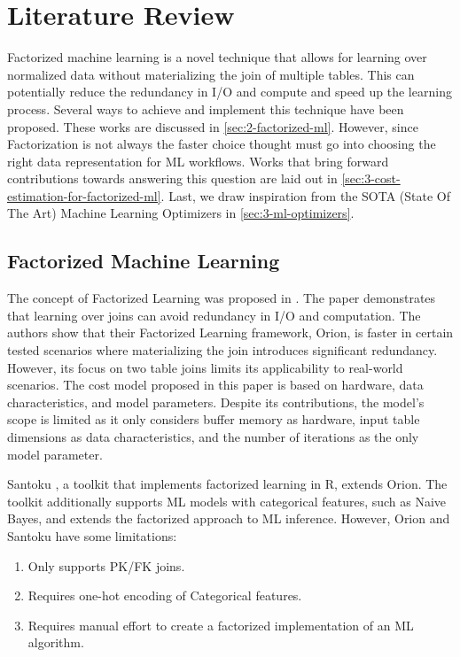 
\chapter{Literature Review}
\label{chapter:literature}

Factorized machine learning is a novel technique that allows for learning over normalized data without materializing the join of multiple tables. This can potentially reduce the redundancy in I/O and compute and speed up the learning process. Several ways to achieve and implement this technique have been proposed. These works are discussed in \autoref{sec:2-factorized-ml}. However, since Factorization is not always the faster choice \cite{orion_learning_gen_lin_models, morpheus} thought must go into choosing the right data representation for ML workflows. Works that bring forward contributions towards answering this question are laid out in \autoref{sec:3-cost-estimation-for-factorized-ml}. Last, we draw inspiration from the SOTA (State Of The Art) Machine Learning Optimizers in \autoref{sec:3-ml-optimizers}.

\section{Factorized Machine Learning}
\label{sec:3-factorized-ml}
The concept of Factorized Learning was proposed in \cite{orion_learning_gen_lin_models}. The paper demonstrates that learning over joins can avoid redundancy in I/O and computation. The authors show that their Factorized Learning framework, Orion, is faster in certain tested scenarios where materializing the join introduces significant redundancy. However, its focus on two table joins limits its applicability to real-world scenarios. The cost model proposed in this paper is based on hardware, data characteristics, and model parameters. Despite its contributions, the model's scope is limited as it only considers buffer memory as hardware, input table dimensions as data characteristics, and the number of iterations as the only model parameter.

Santoku \cite{santoku_kumar_demonstration_2015}, a toolkit that implements factorized learning in R, extends Orion. The toolkit additionally supports ML models with categorical features, such as Naive Bayes, and extends the factorized approach to ML inference. However, Orion and Santoku have some limitations: 

\begin{enumerate}
 \item Only supports PK/FK joins.
 \item Requires one-hot encoding of Categorical features. 
 \item Requires manual effort to create a factorized implementation of an ML algorithm.
\end{enumerate}

